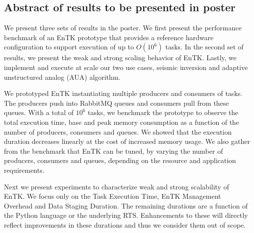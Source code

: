 
\subsection{Abstract of results to be presented in poster}

We present three sets of results in the poster. We first present the performance
benchmark of an EnTK prototype that provides a reference hardware configuration 
to support execution of up to $O(10^6)$ tasks. In the second set of results, we
present the weak and strong scaling behavior of EnTK. Lastly, we implement and 
execute at scale our two use cases, seismic inversion and adaptive unstructured 
analog (AUA) algorithm.

We prototyped EnTK instantiating multiple producers and consumers of tasks.
The producers push into RabbitMQ queues and consumers pull from these queues.
With a total of $10^6$ tasks, we benchmark the prototype to observe the total
execution time, base and peak memory consumption as a function of the number of
producers, consumers and queues.
We showed that the execution duration decreases linearly at the cost of 
increased memory usage. We also gather from the benchmark that EnTK can be 
tuned, by varying the number of producers, consumers and queues, depending on 
the resource and application requirements.


Next we present experiments to characterize weak and strong scalability of EnTK.
We focus only on the Task Execution Time, EnTK Management Overhead and Data 
Staging Duration. The remaining durations are a function of the Python language 
or the underlying RTS. Enhancements to these will directly reflect improvements 
in these durations and thus we consider them out of scope.

